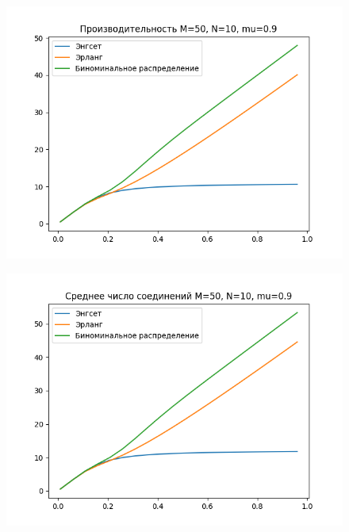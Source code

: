 \documentclass[12pt]{article}
\begin{document}
\begin{figure}[!htb]
\centering
\includegraphics[scale=1.00]{perf_M50_N10_mu09.png}
\caption{}
\label{}
\end{figure}

\begin{figure}[!htb]
\centering
\includegraphics[scale=1.00]{aver_conn_M50_N10_mu09.png}
\caption{}
\label{}
\end{figure}
\end{document}
